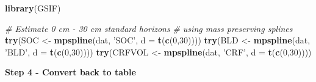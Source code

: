 \documentclass[10pt,b5paper,]{book}
\newenvironment{Shaded}{\begin{snugshade}}{\end{snugshade}}
\newcommand{\CommentTok}[1]{\textcolor[rgb]{0.56,0.35,0.01}{\textit{#1}}}
\newcommand{\DataTypeTok}[1]{\textcolor[rgb]{0.13,0.29,0.53}{#1}}
\newcommand{\DecValTok}[1]{\textcolor[rgb]{0.00,0.00,0.81}{#1}}
\newcommand{\KeywordTok}[1]{\textcolor[rgb]{0.13,0.29,0.53}{\textbf{#1}}}
\newcommand{\NormalTok}[1]{#1}
\newcommand{\OperatorTok}[1]{\textcolor[rgb]{0.81,0.36,0.00}{\textbf{#1}}}
\newcommand{\StringTok}[1]{\textcolor[rgb]{0.31,0.60,0.02}{#1}}
\theoremstyle{definition}
\theoremstyle{definition}
\theoremstyle{definition}
\theoremstyle{remark}
\begin{document}
\begin{Shaded}
\begin{Highlighting}[]
\KeywordTok{library}\NormalTok{(GSIF)}

\CommentTok{# Estimate 0 cm - 30 cm standard horizons}
\CommentTok{# using mass preserving splines}
\KeywordTok{try}\NormalTok{(SOC <-}\StringTok{ }\KeywordTok{mpspline}\NormalTok{(dat, }\StringTok{'SOC'}\NormalTok{, }\DataTypeTok{d =} \KeywordTok{t}\NormalTok{(}\KeywordTok{c}\NormalTok{(}\DecValTok{0}\NormalTok{,}\DecValTok{30}\NormalTok{))))}
\KeywordTok{try}\NormalTok{(BLD <-}\StringTok{ }\KeywordTok{mpspline}\NormalTok{(dat, }\StringTok{'BLD'}\NormalTok{, }\DataTypeTok{d =} \KeywordTok{t}\NormalTok{(}\KeywordTok{c}\NormalTok{(}\DecValTok{0}\NormalTok{,}\DecValTok{30}\NormalTok{))))}
\KeywordTok{try}\NormalTok{(CRFVOL <-}\StringTok{ }\KeywordTok{mpspline}\NormalTok{(dat, }\StringTok{'CRF'}\NormalTok{, }\DataTypeTok{d =} \KeywordTok{t}\NormalTok{(}\KeywordTok{c}\NormalTok{(}\DecValTok{0}\NormalTok{,}\DecValTok{30}\NormalTok{))))}
\end{Highlighting}
\end{Shaded}

\textbf{Step 4 - Convert back to table}

\begin{Shaded}
\end{Shaded}
\end{document}
